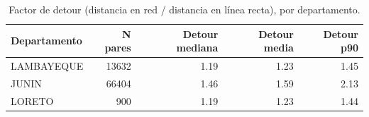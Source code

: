 \begin{table}[H]
\caption{Factor de detour (distancia en red / distancia en línea recta), por departamento.}
\label{tab:detour}
\begin{tabular}{lrrrr}
\toprule
Departamento & N pares & Detour mediana & Detour media & Detour p90 \\
\midrule
LAMBAYEQUE & 13632 & 1.19 & 1.23 & 1.45 \\
JUNIN & 66404 & 1.46 & 1.59 & 2.13 \\
LORETO & 900 & 1.19 & 1.23 & 1.44 \\
\bottomrule
\end{tabular}
\end{table}
